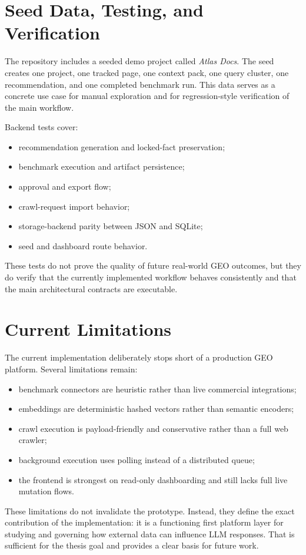 \section{Seed Data, Testing, and Verification}

The repository includes a seeded demo project called \textit{Atlas Docs}. The seed creates one
project, one tracked page, one context pack, one query cluster, one recommendation, and one
completed benchmark run. This data serves as a concrete use case for manual exploration and
for regression-style verification of the main workflow.

Backend tests cover:
\begin{itemize}
    \item recommendation generation and locked-fact preservation;
    \item benchmark execution and artifact persistence;
    \item approval and export flow;
    \item crawl-request import behavior;
    \item storage-backend parity between JSON and SQLite;
    \item seed and dashboard route behavior.
\end{itemize}

These tests do not prove the quality of future real-world GEO outcomes, but they do verify
that the currently implemented workflow behaves consistently and that the main architectural
contracts are executable.

\section{Current Limitations}

The current implementation deliberately stops short of a production GEO platform. Several
limitations remain:
\begin{itemize}
    \item benchmark connectors are heuristic rather than live commercial integrations;
    \item embeddings are deterministic hashed vectors rather than semantic encoders;
    \item crawl execution is payload-friendly and conservative rather than a full web crawler;
    \item background execution uses polling instead of a distributed queue;
    \item the frontend is strongest on read-only dashboarding and still lacks full live mutation flows.
\end{itemize}

These limitations do not invalidate the prototype. Instead, they define the exact contribution of
the implementation: it is a functioning first platform layer for studying and governing how
external data can influence LLM responses. That is sufficient for the thesis goal and provides a
clear basis for future work.
